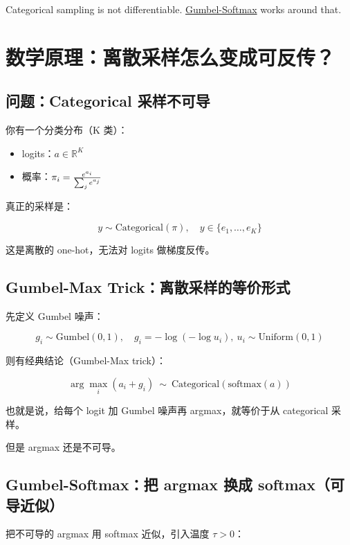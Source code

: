 Categorical sampling is not differentiable. \href{https://arxiv.org/pdf/1611.00712.pdf}{Gumbel-Softmax} works around that.

\section{数学原理：离散采样怎么变成可反传？}

\subsection{问题：Categorical 采样不可导}

你有一个分类分布（K 类）：

\begin{itemize}
  \item logits：\(a \in \mathbb{R}^K\)
  \item 概率：\(\large \pi_i = \frac{e^{a_i}}{\sum_j e^{a_j}}\)
\end{itemize}

真正的采样是：

\[
y \sim \text{Categorical}(\pi), \quad y \in \{e_1,\dots,e_K\}
\]

这是离散的 one-hot，无法对 logits 做梯度反传。

\subsection{Gumbel-Max Trick：离散采样的等价形式}

先定义 Gumbel 噪声：

\[
g_i \sim \text{Gumbel}(0,1),\quad g_i = -\log(-\log u_i),\ u_i\sim \text{Uniform}(0,1)
\]

则有经典结论（Gumbel-Max trick）：

\[
\arg\max_i (a_i + g_i)\ \sim\ \text{Categorical}(\text{softmax}(a))
\]

也就是说，\colorbox{mdc2}{\textcolor{mdc1}{给每个 logit 加 Gumbel 噪声再 argmax，就等价于从 categorical 采样。}}

但是 argmax 还是不可导。

\subsection{Gumbel-Softmax：把 argmax 换成 softmax（可导近似）}

把不可导的 argmax 用 softmax 近似，引入温度 \(\tau>0\)：


